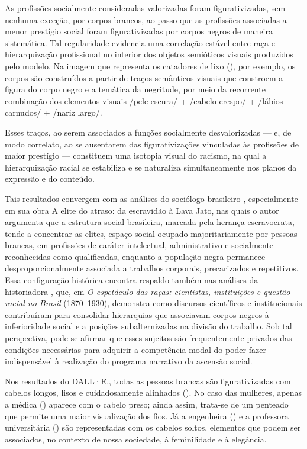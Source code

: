 \documentclass[portuguese]{textolivre}
\begin{document}
As profissões socialmente consideradas valorizadas foram figurativizadas, sem nenhuma exceção, por corpos brancos, ao passo que as profissões associadas a menor prestígio social foram figurativizadas por corpos negros de maneira sistemática. Tal regularidade evidencia uma correlação estável entre raça e hierarquização profissional no interior dos objetos semióticos visuais produzidos pelo modelo. Na imagem que representa os catadores de lixo (), por exemplo, os corpos são construídos a partir de traços semânticos visuais que constroem a figura do corpo negro e a temática da negritude, por meio da recorrente combinação dos elementos visuais /pele escura/ + /cabelo crespo/ + /lábios carnudos/ + /nariz largo/.

Esses traços, ao serem associados a funções socialmente desvalorizadas — e, de modo correlato, ao se ausentarem das figurativizações vinculadas às profissões de maior prestígio — constituem uma isotopia visual do racismo, na qual a hierarquização racial se estabiliza e se naturaliza simultaneamente nos planos da expressão e do conteúdo.

Tais resultados convergem com as análises do sociólogo brasileiro \textcite{souza2017elite}, especialmente em sua obra A elite do atraso: da escravidão à Lava Jato, nas quais o autor argumenta que a estrutura social brasileira, marcada pela herança escravocrata, tende a concentrar as elites, espaço social ocupado majoritariamente por pessoas brancas, em profissões de caráter intelectual, administrativo e socialmente reconhecidas como qualificadas, enquanto a população negra permanece desproporcionalmente associada a trabalhos corporais, precarizados e repetitivos. Essa configuração histórica encontra respaldo também nas análises da historiadora \textcite{schwarcz1993espetaculo}, que, em \textit{O espetáculo das raças: cientistas, instituições e questão racial no Brasil} (1870–1930), demonstra como discursos científicos e institucionais contribuíram para consolidar hierarquias que associavam corpos negros à inferioridade social e a posições subalternizadas na divisão do trabalho. Sob tal perspectiva, pode-se afirmar que esses sujeitos são frequentemente privados das condições necessárias para adquirir a competência modal do poder-fazer indispensável à realização do programa narrativo da ascensão social.

Nos resultados do DALL·E., todas as pessoas brancas são figurativizadas com cabelos longos, lisos e cuidadosamente alinhados (). No caso das mulheres, apenas a médica () aparece com o cabelo preso; ainda assim, trata-se de um penteado que permite uma maior visualização dos fios. Já a engenheira () e a professora universitária () são representadas com os cabelos soltos, elementos que podem ser associados, no contexto de nossa sociedade, à feminilidade e à elegância.
\end{document}

